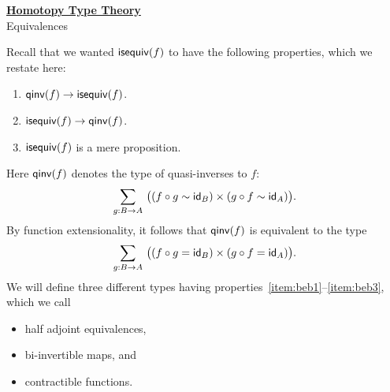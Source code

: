 \documentclass[hott-all.tex]{subfiles}
\begin{document}
\begin{center}
  {\Large{\underline{\textbf{Homotopy Type Theory}}}} \\[2mm]
  {\large Equivalences}
\end{center}

\setcounter{chapter}{4}



Recall that we wanted $\mathsf{isequiv}(f)$ to have the following properties, which we
restate here:

\begin{enumerate}
\item $\mathsf{qinv}(f) \to \mathsf{isequiv} (f)$.\label{item:beb1}
\item $\mathsf{isequiv} (f) \to \mathsf{qinv}(f)$.\label{item:beb2}
\item $\mathsf{isequiv}(f)$ is a mere proposition.\label{item:beb3}
\end{enumerate}
Here $\mathsf{qinv}(f)$ denotes the type of quasi-inverses to $f$:
\begin{equation*}
  \sm{g:B\to A} \big((f \circ g \htpy \idfunc[B]) \times (g\circ f \htpy \idfunc[A])\big).
\end{equation*}
By function extensionality, it follows that $\mathsf{qinv}(f)$ is equivalent to the type
\begin{equation*}
  \sm{g:B\to A} \big((f \circ g = \idfunc[B]) \times (g\circ f = \idfunc[A])\big).
\end{equation*}
We will define three different types having properties~\ref{item:beb1}--\ref{item:beb3}, which we call
\begin{itemize}
\item half adjoint equivalences,
\item bi-invertible maps,
  and
\item contractible functions.
\end{itemize}
%
\end{document}
